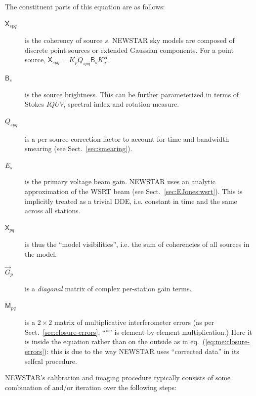 \documentclass[]{aa}
\newcommand{\herm}{H}
\newcommand{\jones}[2]{\vec {#1}_{#2}}
\newcommand{\coh}[2]{\mathsf{{#1}}_{{#2}}}
\begin{document}
The constituent parts of this equation are as follows:
\begin{description}
\item[$\coh{X}{spq}$] is the coherency of source $s$. NEWSTAR sky models are composed of discrete point sources or extended Gaussian components. For a point source, $\coh{X}{spq} = K_p Q_{spq} \coh{B}{s} K^\herm_q$.

\item[$\coh{B}{s}$] is the source brightness. This can be further parameterized in terms of Stokes $IQUV$, spectral index and rotation measure.

\item[$Q_{spq}$] is a per-source correction factor to account for time and bandwidth smearing (see Sect.~\ref{sec:smearing}).

\item[$E_s$] is the primary voltage beam gain. NEWSTAR uses an analytic approximation of the WSRT beam (see Sect.~\ref{sec:EJones:wsrt}). This is implicitly treated as a trivial DDE, i.e. constant in time and the same across all stations.

\item[$\coh{X}{pq}$] is thus the ``model visibilities'', i.e. the sum of coherencies of all sources in the model.

\item[$\jones{G}{p}$] is a {\em diagonal} matrix of complex per-station gain terms.

\item[$\coh{M}{pq}$] is a $2\times2$ matrix of multiplicative interferometer errors (as per Sect.~\ref{sec:closure-errors}, ``$\ast$'' is element-by-element multiplication.) Here it is inside the equation rather than on the outside as in eq.~(\ref{eq:me:closure-errors}): this is due to the way NEWSTAR uses ``corrected data'' in its selfcal procedure.%

\end{description}

NEWSTAR's calibration and imaging procedure typically consists of some combination of and/or iteration over the following steps:
\end{document}

